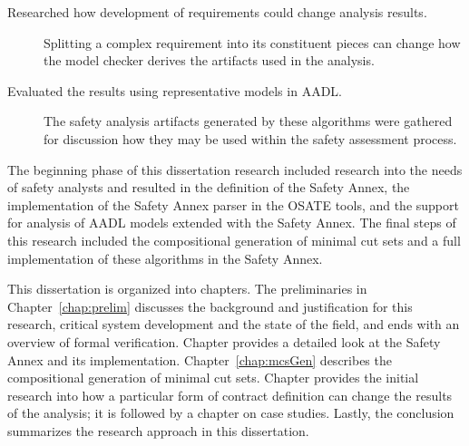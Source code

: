 \begin{description}
\item[Researched how development of requirements could change analysis results.] Splitting a complex requirement into its constituent pieces can change how the model checker derives the artifacts used in the analysis.


 
\item[Evaluated the results using representative models in AADL.] The safety analysis artifacts generated by these algorithms were gathered for discussion how they may be used within the safety assessment process.
\end{description}

The beginning phase of this dissertation research included research into the needs of safety analysts and resulted in the definition of the Safety Annex, the implementation of the Safety Annex parser in the OSATE tools, and the support for analysis of AADL models extended with the Safety Annex. The final steps of this research included the compositional generation of minimal cut sets and a full implementation of these algorithms in the Safety Annex. 

This dissertation is organized into  chapters. The preliminaries in Chapter~\ref{chap:prelim} discusses the background and justification for this research, critical system development and the state of the field, and ends with an overview of formal verification. Chapter \label{chap:faultModeling} provides a detailed look at the Safety Annex and its implementation. Chapter~\ref{chap:mcsGen} describes the compositional generation of minimal cut sets. Chapter \label{chap:granularity} provides the initial research into how a particular form of contract definition can change the results of the analysis; it is followed by a chapter on case studies. Lastly, the conclusion summarizes the research approach in this dissertation.


